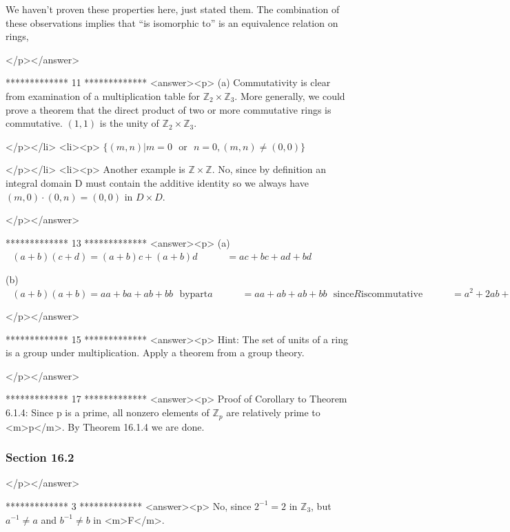 We haven{'}t proven these properties here, just stated them.  The combination of these observations implies that {``}is isomorphic to{''} is an
equivalence relation on rings,

</p></answer>


*************
11
*************
<answer><p> (a) Commutativity is clear from examination of a multiplication table for \(\mathbb{Z}_2\times  \mathbb{Z}_3\). More generally, we could prove
a theorem that the direct product of two or more commutative rings is commutative. \((1, 1)\) is the unity of \(\mathbb{Z}_2\times  \mathbb{Z}_3\).

</p></li>
<li><p> \(\{(m, n) | m = 0\text{  }\text{or}\text{  }n = 0, (m, n) \neq  (0, 0)\}\)

</p></li>
<li><p>  Another example is \(\mathbb{Z} \times  \mathbb{Z}\).  No, since by definition an integral domain D must contain the additive identity {
}so we always have \((m, 0) \cdot  (0, n) = (0, 0)\) in \(D \times  D\).

</p></answer>


*************
13
*************
<answer><p> (a)    \(\text{                }(a + b)(c + d) = (a + b)c + (a + b)d \quad \quad \quad = a c + b c + a d + b d\)



      (b) \(\text{               }(a + b)(a + b )= a a + b a + a b + b b\text{                  }\text{by} \text{part} a\quad \quad \quad =
a a + a b + a b + b b\text{    }\text{since} R \text{is} \text{commutative}\quad \quad \quad =a^2 + 2a b + b^2\)

</p></answer>


*************
15
*************
<answer><p> Hint: The set of units of a ring is a group under multiplication. Apply a theorem from a group theory.

</p></answer>


*************
17
*************
<answer><p>  Proof of Corollary to Theorem 6.1.4: Since p is a prime, all nonzero elements of \(\mathbb{Z}_p\) are relatively prime to <m>p</m>.  By
Theorem 16.1.4 we are done.


\subsubsection{Section 16.2}

</p></answer>


*************
3
*************
<answer><p> No, since \(2^{-1}= 2\) in \(\mathbb{Z}_3\), but \(a^{-1}\neq a\) and \(b^{-1}\neq b\) in <m>F</m>.

